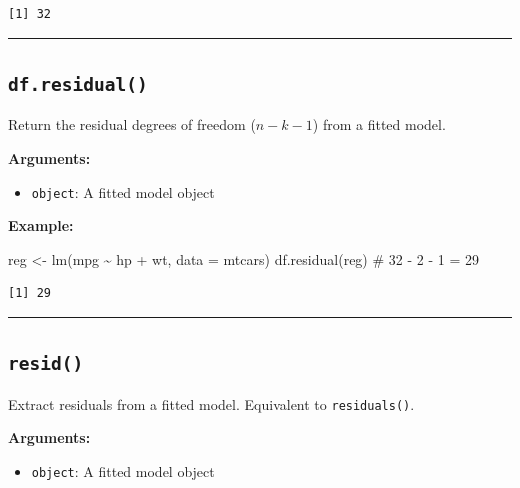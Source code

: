 \documentclass[
  letterpaper,
  DIV=11,
  numbers=noendperiod]{scrreprt}
\newenvironment{Shaded}{\begin{snugshade}}{\end{snugshade}}
\newcommand{\AttributeTok}[1]{\textcolor[rgb]{0.40,0.45,0.13}{#1}}
\newcommand{\CommentTok}[1]{\textcolor[rgb]{0.37,0.37,0.37}{#1}}
\newcommand{\FunctionTok}[1]{\textcolor[rgb]{0.28,0.35,0.67}{#1}}
\newcommand{\NormalTok}[1]{\textcolor[rgb]{0.00,0.23,0.31}{#1}}
\newcommand{\OtherTok}[1]{\textcolor[rgb]{0.00,0.23,0.31}{#1}}
\newcommand{\SpecialCharTok}[1]{\textcolor[rgb]{0.37,0.37,0.37}{#1}}
\providecommand{\tightlist}{%
  \setlength{\itemsep}{0pt}\setlength{\parskip}{0pt}}
\begin{document}
\begin{verbatim}
[1] 32
\end{verbatim}

\begin{center}\rule{0.5\linewidth}{0.5pt}\end{center}

\subsection{\texorpdfstring{\texttt{df.residual()}}{df.residual()}}\label{df.residual}

Return the residual degrees of freedom (\(n - k - 1\)) from a fitted
model.

\textbf{Arguments:}

\begin{itemize}
\tightlist
\item
  \texttt{object}: A fitted model object
\end{itemize}

\textbf{Example:}

\begin{Shaded}
\begin{Highlighting}[]
\NormalTok{reg }\OtherTok{\textless{}{-}} \FunctionTok{lm}\NormalTok{(mpg }\SpecialCharTok{\textasciitilde{}}\NormalTok{ hp }\SpecialCharTok{+}\NormalTok{ wt, }\AttributeTok{data =}\NormalTok{ mtcars)}
\FunctionTok{df.residual}\NormalTok{(reg)  }\CommentTok{\# 32 {-} 2 {-} 1 = 29}
\end{Highlighting}
\end{Shaded}

\begin{verbatim}
[1] 29
\end{verbatim}

\begin{center}\rule{0.5\linewidth}{0.5pt}\end{center}

\subsection{\texorpdfstring{\texttt{resid()}}{resid()}}\label{resid}

Extract residuals from a fitted model. Equivalent to
\texttt{residuals()}.

\textbf{Arguments:}

\begin{itemize}
\tightlist
\item
  \texttt{object}: A fitted model object
\end{itemize}
\end{document}
